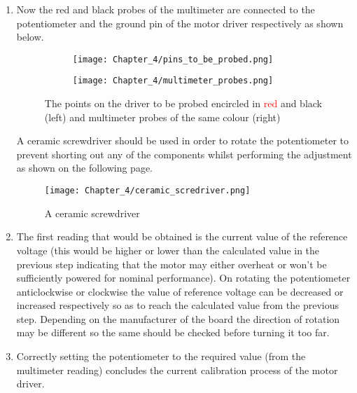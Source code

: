 \begin{enumerate}
 \item Now the red and black probes of the multimeter are connected to the potentiometer and the ground pin of the motor driver respectively as shown below. 

       \begin{figure}[h]
        \hspace{20mm}
        \begin{subfigure}{0.5\textwidth}
         \texttt{[image: Chapter\_4/pins\_to\_be\_probed.png]}
         \label{fig:to_be_probed}
        \end{subfigure}
        \hspace{-20mm}
        \begin{subfigure}{0.5\textwidth}
         \texttt{[image: Chapter\_4/multimeter\_probes.png]}
         \label{fig:multimeter_probes}
        \end{subfigure}

        \caption{The points on the driver to be probed encircled in \textcolor{red}{red} and black (left) and multimeter probes of the same colour (right)}
        \label{fig:probes}
       \end{figure}
       
       
       A ceramic screwdriver should be used in order to rotate the potentiometer to prevent shorting out any of the components whilst performing the adjustment as shown on the following page.

       \begin{figure}[h]
        \centering
        \texttt{[image: Chapter\_4/ceramic\_scredriver.png]}
        \caption{A ceramic screwdriver}
        \label{fig:ceramic_scredriver}
       \end{figure}

 \item   The first reading that would be obtained is the current value of the reference voltage (this would be higher or lower than the calculated value in the previous step indicating that the motor may either overheat or won’t be sufficiently powered for nominal performance). On rotating the potentiometer anticlockwise or clockwise the value of reference voltage can be decreased or increased respectively so as to reach the calculated value from the previous step. Depending on the manufacturer of the board the direction of rotation may be different so the same should be checked before turning it too far.

 \item  Correctly setting the potentiometer to the required value (from the multimeter reading) concludes the current calibration process of the motor driver.
\end{enumerate}



